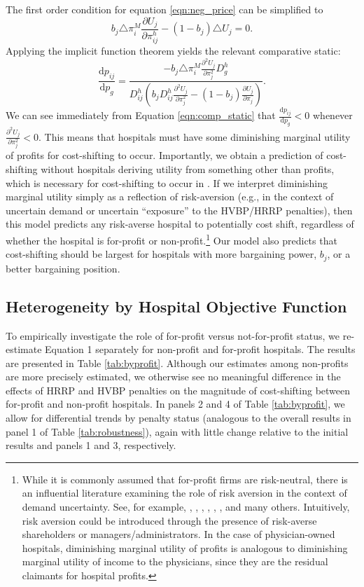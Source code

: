 \documentclass[12pt]{article}
\newcommand{\deriv}[2]{\frac{\mathrm{d}#1}{\mathrm{d}#2}}
\newcommand{\pderiv}[2]{\frac{\partial#1}{\partial#2}}
\begin{document}
The first order condition for equation \ref{eqn:neg_price} can be simplified to
\begin{equation}
 b_{j} \triangle \pi_{i}^{M} \pderiv{U_{j}}{\pi_{ij}^{h}} - (1-b_{j}) \triangle U_{j} = 0.
\label{eqn:price_foc}
\end{equation}
Applying the implicit function theorem yields the relevant comparative static:
\begin{equation}
\deriv{p_{ij}}{p_{g}} = \frac{- b_{j} \triangle \pi_{i}^{M} \pderiv{^{2}U_{j}}{\pi_{j}^{2}}D_{g}^{h}}{D_{ij}^{h}\left(b_{j} D_{ij}^{h} \pderiv{^{2}U_{j}}{\pi_{j}^{2}} - (1-b_{j}) \pderiv{U_{j}}{\pi_{j}} \right)}.
\label{eqn:comp_static}
\end{equation}
We can see immediately from Equation \ref{eqn:comp_static} that $\deriv{p_{ij}}{p_{g}}<0$ whenever $\pderiv{^{2}U_{j}}{\pi_{j}^{2}}<0$. This means that hospitals must have some diminishing marginal utility of profits for cost-shifting to occur. Importantly, we obtain a prediction of cost-shifting without hospitals deriving utility from something other than profits, which is necessary for cost-shifting to occur in \cite{dranove1988}. If we interpret diminishing marginal utility simply as a reflection of risk-aversion (e.g., in the context of uncertain demand or uncertain ``exposure'' to the HVBP/HRRP penalties), then this model predicts any risk-averse hospital to potentially cost shift, regardless of whether the hospital is for-profit or non-profit.\footnote{While it is commonly assumed that for-profit firms are risk-neutral, there is an influential literature examining the role of risk aversion in the context of demand uncertainty. See, for example, \cite{sandmo1971}, \cite{holthausen1979}, \cite{mcdonald1985}, \cite{guiso1999}, \cite{chavas1996}, \cite{asplund2002}, and many others. Intuitively, risk aversion could be introduced through the presence of risk-averse shareholders or managers/administrators. In the case of physician-owned hospitals, diminishing marginal utility of profits is analogous to diminishing marginal utility of income to the physicians, since they are the residual claimants for hospital profits.} Our model also predicts that cost-shifting should be largest for hospitals with more bargaining power, $b_{j}$, or a better bargaining position.

\subsection{Heterogeneity by Hospital Objective Function}
To empirically investigate the role of for-profit versus not-for-profit status, we re-estimate Equation 1 separately for non-profit and for-profit hospitals.  The results are presented in Table \ref{tab:byprofit}. Although our estimates among non-profits are more precisely estimated, we otherwise see no meaningful difference in the effects of HRRP and HVBP penalties on the magnitude of cost-shifting between for-profit and non-profit hospitals. In panels 2 and 4 of Table \ref{tab:byprofit}, we allow for differential trends by penalty status (analogous to the overall results in panel 1 of Table \ref{tab:robustness}), again with little change relative to the initial results and panels 1 and 3, respectively.
\end{document}
